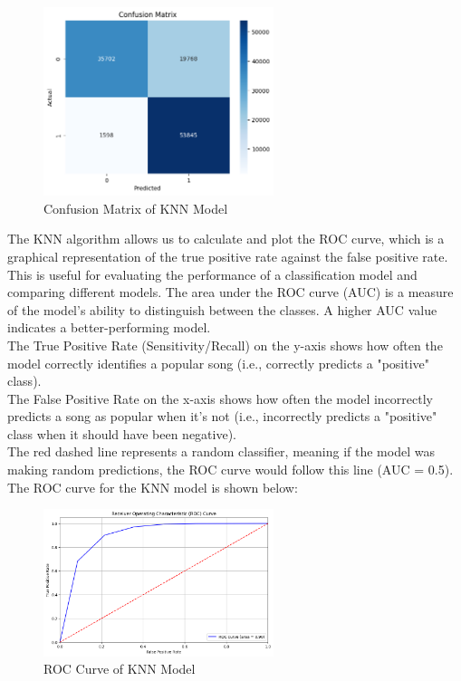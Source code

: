 \begin{figure}[h] 
    \centering 
    \includegraphics[width=0.6\textwidth]{media/knn_confusion_matrix.png}
    \caption{Confusion Matrix of KNN Model}

\end{figure}

\newpage

The KNN algorithm allows us to calculate and plot the ROC curve, which is a graphical representation of the true positive rate against the false positive rate. This is useful for evaluating the performance of a classification model and comparing different models. The area under the ROC curve (AUC) is a measure of the model's ability to distinguish between the classes. A higher AUC value indicates a better-performing model.\\
The True Positive Rate (Sensitivity/Recall) on the y-axis shows how often the model correctly identifies a popular song (i.e., correctly predicts a "positive" class).\\
The False Positive Rate on the x-axis shows how often the model incorrectly predicts a song as popular when it's not (i.e., incorrectly predicts a "positive" class when it should have been negative).\\
The red dashed line represents a random classifier, meaning if the model was making random predictions, the ROC curve would follow this line (AUC = 0.5).\\
The ROC curve for the KNN model is shown below:

\begin{figure} [H]
    \centering
    \includegraphics[width=0.6\textwidth]{media/roc_curve.png}
    \caption{ROC Curve of KNN Model}
    \label{fig:knn_roc_curve}
\end{figure}

